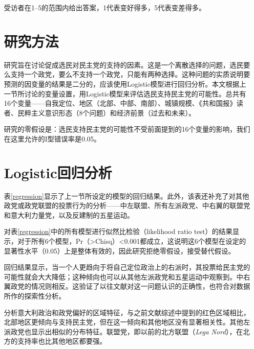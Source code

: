 \documentclass[12pt,a4paper]{ctexart}
\begin{document}
    受访者在1--5的范围内给出答案，1代表变好得多，5代表变差得多。

    \section{研究方法}

    研究旨在讨论促成选民对民主党的支持的因素。这是一个离散选择的问题，选民要么支持一个政党，要么不支持一个政党，只能有两种选择。\cite{fiorina1977outline,van2006rethinking}这种问题的实质说明要预测的因变量的结果是二分的，应该使用Logistic模型进行回归分析。本文根据上一节所讨论的变量设置，用Logistic模型来评估选民支持民主党的可能性。总共有16个变量——自我定位、地区（北部、中部、南部）、城镇规模、《共和国报》读者、民粹主义意识形态（8个问题）和经济前景（过去和未来）。

    研究的零假设是：选民支持民主党的可能性不受前面提到的16个变量的影响，我们在这里允许的I型错误率是0.05。

    \section{Logistic回归分析}

    表\ref{regression}显示了上一节所设定的模型的回归结果。此外，该表还补充了对其他政党或政党联盟的投票行为的分析——中左联盟、所有左派政党、中右翼的联盟党和意大利力量党，以及反建制的五星运动。

    \newpage
    \begin{landscape}
        
    \end{landscape}

    \newpage
    \restoregeometry

    对表\ref{regression}中的所有模型进行似然比检验（likelihood ratio test）的结果显示，对于所有6个模型，Pr（>Chisq）<0.001都成立，这说明这6个模型在设定的显著性水平（0.05）上是整体有效的，因此研究拒绝零假设，接受替代假设。

    回归结果显示，当一个人更趋向于将自己定位政治上的右派时，其投票给民主党的可能性就会大大降低；这种倾向也可以从其他左派政党和五星运动中观察到。中右翼政党的情况则相反。这验证了以往文献对这一问题认识的正确性，也符合对数据所作的探索性分析。

    分析意大利政治和政党偏好的区域特征，与之前文献综述中提到的红色区域相比，北部地区更倾向与支持民主党，但在这一倾向和其他地区没有显著相关性。其他左派政党也显示出相似的分布特征。联盟党，即以前的北方联盟（\textit{Lega Nord}），在北方的支持率也比其他地区都要强。
\end{document}
